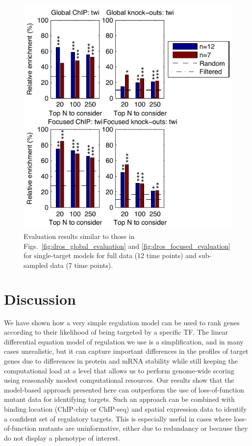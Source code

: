 \documentclass{pnastwo}
\begin{document}
\begin{article}
\begin{figure}[tb]
  \centering
  \includegraphics{dros_data_size_evaluation}
  \caption{Evaluation results similar to those in 
    Figs.~\ref{fig:dros_global_evaluation} and 
    \ref{fig:dros_focused_evaluation} for single-target models
    for full data (12 time points) and sub-sampled data (7 time points).
    \label{fig:dros_data_size_evaluation}
  }
\end{figure}

\section{Discussion}

We have shown how a very simple regulation model can be used to rank
genes according to their likelihood of being targeted by a specific
TF. The linear differential equation model of regulation we use is a simplification, and in
many cases unrealistic, but it can capture important differences in
the profiles of target genes due to differences in protein and mRNA
stability while still keeping the computational load at a level
that allows us to perform genome-wide scoring using reasonably modest
computational resources. Our results show
that the model-based approach presented here can outperform the use of
loss-of-function mutant data for identifying targets. Such an approach
can be combined with binding location (ChIP-chip or ChIP-seq)
and spatial expression data to identify a confident set of regulatory
targets. This is especially useful in cases where loss-of-function
mutants are uninformative, either due to redundancy or because they do
not display a phenotype of interest. 


\end{article}
\end{document}
